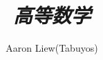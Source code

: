 \documentclass[UTF8,fontset=ubuntu]{ctexart}
\begin{document}
\title{\textit {高等数学}}
\author{Aaron Liew(Tabuyos)}
\maketitle


\end{document}
